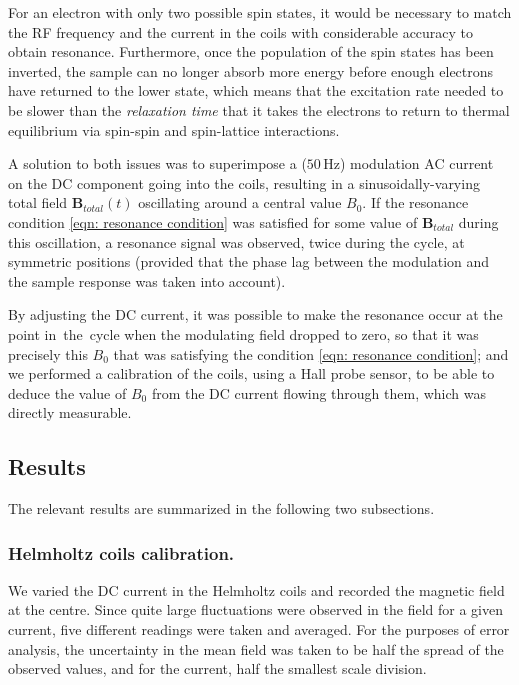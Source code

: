 \documentclass[a4paper]{jpconf}
\numberwithin{equation}{section}
\begin{document}
For an electron with only two possible spin states, it would be necessary to match the RF frequency and the current in the coils with considerable accuracy to obtain resonance. Furthermore, once the population of the spin states has been inverted, the sample can no longer absorb more energy before enough electrons have returned to the lower state, which means that the excitation rate needed to be slower than the \emph{relaxation time} that it takes the electrons to return to thermal equilibrium via spin-spin and spin-lattice interactions. 

A solution to both issues was to superimpose a ($50 \, \si{\hertz}$) modulation AC current on the DC component going into the coils, resulting in a sinusoidally-varying total field $\mathbf{B}_{total}(t)$ oscillating around a central value $B_0$. If the resonance condition \eqref{eqn: resonance condition} was satisfied for some value of $\mathbf{B}_{total}$ during this oscillation, a resonance signal was observed, twice during the cycle, at symmetric positions (provided that the phase lag between the modulation and the sample response was taken into account). 

By adjusting the DC current, it was possible to make the resonance occur at the point in~the~cycle when the modulating field dropped to zero, so that it was precisely this $B_0$ that was satisfying the condition \eqref{eqn: resonance condition}; and we performed a calibration of the coils, using a Hall probe sensor, to be able to deduce the value of $B_0$ from the DC current flowing through them, which was directly measurable. 

\subsection{Results}
The relevant results are summarized in the following two subsections.

\subsubsection{Helmholtz coils calibration.} \label{section: calibration}
We varied the DC current in the Helmholtz coils and recorded the magnetic field at the centre. Since quite large fluctuations were observed in the field for a given current, five different readings were taken and averaged. For the purposes of error analysis, the uncertainty in the mean field was taken to be half the spread of the observed values, and for the current, half the smallest scale division. 
\end{document}

